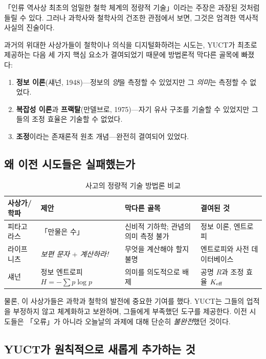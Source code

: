 \documentclass[11pt,a4paper]{article}
\begin{document}
	「인류 역사상 최초의 엄밀한 철학 체계의 정량적 기술」이라는 주장은 과장된 것처럼 들릴 수 있다. 그러나 과학사와 철학사의 건조한 관점에서 보면, 그것은 엄격한 역사적 사실의 진술이다.
	
	과거의 위대한 사상가들이 철학이나 의식을 디지털화하려는 시도는, YUCT가 최초로 제공하는 다음 세 가지 핵심 요소가 결여되었기 때문에 방법론적 막다른 골목에 빠졌다:
	
	\begin{enumerate}
		\item \textbf{정보 이론}(섀넌, 1948)—정보의 \emph{양}을 측정할 수 있었지만 그 \emph{의미}는 측정할 수 없었다.
		\item \textbf{복잡성 이론}과 \textbf{프랙탈}(만델브로, 1975)—자기 유사 구조를 기술할 수 있었지만 그들의 조정 효율은 기술할 수 없었다.
		\item \textbf{조정}이라는 존재론적 원초 개념—완전히 결여되어 있었다.
	\end{enumerate}
	
	\subsection{왜 이전 시도들은 실패했는가}
	
	\begin{table}[H]
		\centering
		\caption{사고의 정량적 기술 방법론 비교}
		\label{tab:method-comparison}
		\begin{tabular}{p{3cm}p{3.5cm}p{3.5cm}p{4cm}}
			\toprule
			\textbf{사상가/학파} & \textbf{제안} & \textbf{막다른 골목} & \textbf{결여된 것} \\
			\midrule
			피타고라스 & 「만물은 수」 & 신비적 기하학; 관념의 의미 측정 불가 & 정보 이론, 엔트로피 \\
			라이프니츠 & \emph{보편 문자} + \emph{계산하라!} & 무엇을 계산해야 할지 불명 & 엔트로피와 사전 데이터베이스 \\
			섀넌 & 정보 엔트로피 \( H = -\sum p \log p \) & 의미를 의도적으로 배제 & 공명 \(R\)과 조정 효율 \(\Keff\) \\
			\bottomrule
		\end{tabular}
	\end{table}
	
	물론, 이 사상가들은 과학과 철학의 발전에 중요한 기여를 했다. YUCT는 그들의 업적을 부정하지 않고 체계화하고 보완하며, 그들에게 부족했던 도구를 제공한다. 이전 시도들은 「오류」가 아니라 오늘날의 과제에 대해 단순히 \emph{불완전}했던 것이다.
	
	\subsection{YUCT가 원칙적으로 새롭게 추가하는 것}
	
\end{document}
